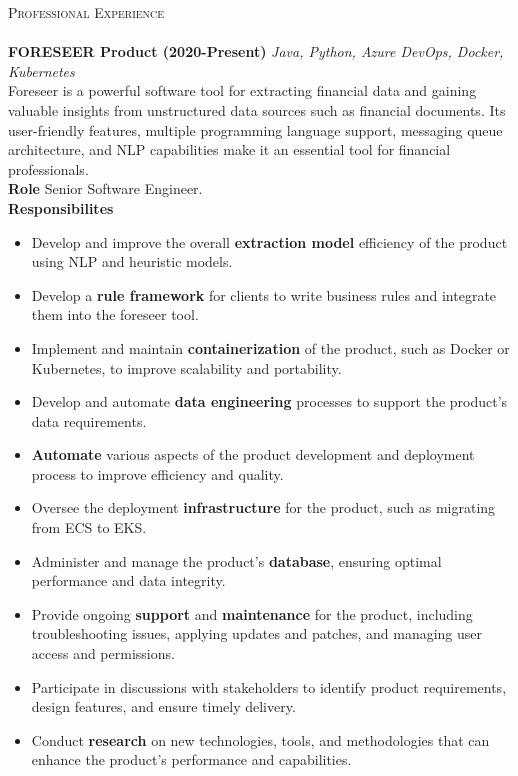 \documentclass[a4paper]{article}
\newcommand{\lineunder} {
    \vspace*{-8pt} \\
    \hspace*{-18pt} \hrulefill \\
}
\newcommand{\header} [1] {
    {\hspace*{-18pt}\vspace*{6pt} \textsc{#1}}
    \vspace*{-6pt} \lineunder
}
\begin{document}
\header{Professional Experience}
\vspace{1mm}
\textbf{FORESEER Product (2020-Present)}
{\hfill \sl Java, Python, Azure DevOps, Docker, Kubernetes} \\
Foreseer is a powerful software tool for extracting financial data and gaining valuable insights from unstructured data sources such as financial documents. Its user-friendly features, multiple programming language support, messaging queue architecture, and NLP capabilities make it an essential tool for financial professionals.\\
\vspace{1mm}
\textbf{Role}
Senior Software Engineer.\\
\vspace{1mm}
\textbf{Responsibilites}
\begin{itemize} \itemsep 1pt
\item Develop and improve the overall \textbf{extraction model} efficiency of the product using NLP and heuristic models.
\item Develop a \textbf{rule framework} for clients to write business rules and integrate them into the foreseer tool.
\item Implement and maintain \textbf{containerization} of the product, such as Docker or Kubernetes, to improve scalability and portability.
\item Develop and automate \textbf{data engineering} processes to support the product's data requirements.
\item \textbf{Automate} various aspects of the product development and deployment process to improve efficiency and quality.
\item Oversee the deployment \textbf{infrastructure} for the product, such as migrating from ECS to EKS.
\item Administer and manage the product's \textbf{database}, ensuring optimal performance and data integrity.
\item Provide ongoing \textbf{support} and \textbf{maintenance} for the product, including troubleshooting issues, applying updates and patches, and managing user access and permissions.
\item Participate in discussions with stakeholders to identify product requirements, design features, and ensure timely delivery.
\item Conduct \textbf{research} on new technologies, tools, and methodologies that can enhance the product's performance and capabilities.
\end{itemize}
\end{document}
